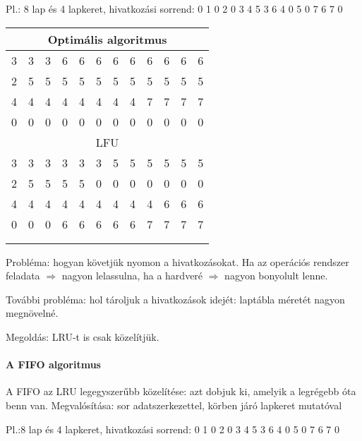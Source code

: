 \documentclass[fleqn,10pt,a4paper]{article}
\newcommand{\nn}{\Rightarrow}
\theoremstyle{magyar}
\begin{document}
  Pl.: 8 lap és 4 lapkeret, hivatkozási sorrend: 0 1 0 2 0 3 4 5 3 6 4 0 5 0 7 6 7 0\\
  
  \begin{tabular}{@{}cccccccccccc@{}}\toprule
    \multicolumn{12}{c}{Optimális algoritmus}\\\midrule
    3 & 3 & 3 & 6 & 6 & 6 & 6 & 6 & 6 & 6 & 6 & 6\\
    2 & 5 & 5 & 5 & 5 & 5 & 5 & 5 & 5 & 5 & 5 & 5\\
    4 & 4 & 4 & 4 & 4 & 4 & 4 & 4 & 7 & 7 & 7 & 7\\
    0 & 0 & 0 & 0 & 0 & 0 & 0 & 0 & 0 & 0 & 0 & 0\\\midrule
    \multicolumn{12}{c}{LFU}\\\midrule
    3 & 3 & 3 & 3 & 3 & 3 & 5 & 5 & 5 & 5 & 5 & 5\\
    2 & 5 & 5 & 5 & 5 & 0 & 0 & 0 & 0 & 0 & 0 & 0\\
    4 & 4 & 4 & 4 & 4 & 4 & 4 & 4 & 4 & 6 & 6 & 6\\
    0 & 0 & 0 & 6 & 6 & 6 & 6 & 6 & 7 & 7 & 7 & 7\\\bottomrule\\\\
  \end{tabular}
  
  Probléma: hogyan követjük nyomon a hivatkozásokat. Ha az operációs rendszer feladata $\nn$ nagyon lelassulna, ha a
  hardveré $\nn$ nagyon bonyolult lenne.
  
  További probléma: hol tároljuk a hivatkozások idejét: laptábla méretét nagyon megnövelné.
  
  Megoldás: LRU-t is csak közelítjük.

  \paragraph{A FIFO algoritmus} A FIFO az LRU legegyszerűbb közelítése: azt dobjuk ki, amelyik a legrégebb óta benn van.
  Megvalósítása: sor adatszerkezettel, körben járó lapkeret mutatóval

  Pl.:8 lap és 4 lapkeret, hivatkozási sorrend: 0 1 0 2 0 3 4 5 3 6 4 0 5 0 7 6 7 0 \\
  
\end{document}
